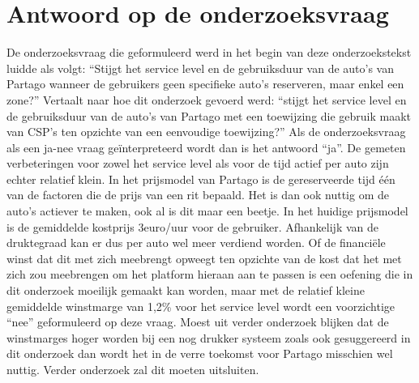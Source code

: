 \section{Antwoord op de onderzoeksvraag}
De onderzoeksvraag die geformuleerd werd in het begin van deze onderzoekstekst luidde als volgt: ``Stijgt het service level en de gebruiksduur van de auto's van Partago  wanneer de gebruikers geen specifieke auto's reserveren, maar enkel een zone?'' Vertaalt naar hoe dit onderzoek gevoerd werd: ``stijgt het service level en de gebruiksduur van de auto's van Partago met een toewijzing die gebruik maakt van CSP's ten opzichte van een eenvoudige toewijzing?'' Als de onderzoeksvraag als een ja-nee vraag geïnterpreteerd wordt dan is het antwoord ``ja''. De gemeten verbeteringen voor zowel het service level als voor de tijd actief per auto zijn echter relatief klein. In het prijsmodel van Partago is de gereserveerde tijd één van de factoren die de prijs van een rit bepaald. Het is dan ook nuttig om de auto's actiever te maken, ook al is dit maar een beetje. In het huidige prijsmodel is de gemiddelde kostprijs 3euro/uur voor de gebruiker. Afhankelijk van de druktegraad kan er dus per auto wel meer verdiend worden. Of de financiële winst dat dit met zich meebrengt opweegt ten opzichte van de kost dat het met zich zou meebrengen om het platform hieraan aan te passen is een oefening die in dit onderzoek moeilijk gemaakt kan worden, maar met de relatief kleine gemiddelde winstmarge van 1,2\% voor het service level wordt een voorzichtige ``nee'' geformuleerd op deze vraag. Moest uit verder onderzoek blijken dat de winstmarges hoger worden bij een nog drukker systeem zoals ook gesuggereerd in dit onderzoek dan wordt het in de verre toekomst voor Partago misschien wel nuttig. Verder onderzoek zal dit moeten uitsluiten.

